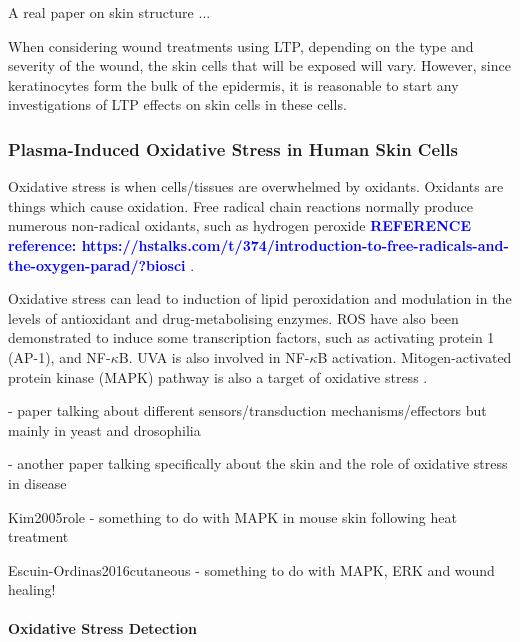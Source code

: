 \documentclass[11pt, oneside]{article}   	%
\newcommand{\toref}[1]{ \textcolor{blue}{\bf{REFERENCE #1}}}
\begin{document}
A real paper on skin structure \cite{Mancini2014microRNAs}...

When considering wound treatments using LTP, depending on the type and severity of the wound, the skin cells that will be exposed will vary.
However, since keratinocytes form the bulk of the epidermis, it is reasonable to start any investigations of LTP effects on skin cells in these cells.



\subsubsection{Plasma-Induced Oxidative Stress in Human Skin Cells}

Oxidative stress is when cells/tissues are overwhelmed by oxidants. 
Oxidants are things which cause oxidation.
Free radical chain reactions normally produce numerous non-radical oxidants, such as hydrogen peroxide \toref{reference: https://hstalks.com/t/374/introduction-to-free-radicals-and-the-oxygen-parad/?biosci} .

Oxidative stress can lead to induction of lipid peroxidation and modulation in the levels of antioxidant and drug-metabolising enzymes.
ROS have also been demonstrated to induce some transcription factors, such as activating protein 1 (AP-1), and NF-$\kappa$B. 
UVA is also involved in NF-$\kappa$B activation.
Mitogen-activated protein kinase (MAPK) pathway is also a target of oxidative stress \cite{Bickers2006oxidative}.

\cite{Nadal2011controlling} - paper talking about different sensors/transduction mechanisms/effectors but mainly in yeast and drosophilia

\cite{Bickers2006oxidative} - another paper talking specifically about the skin and the role of oxidative stress in disease

Kim2005role - something to do with MAPK in mouse skin following heat treatment

Escuin-Ordinas2016cutaneous - something to do with MAPK, ERK and wound healing!

\paragraph{Oxidative Stress Detection}
\end{document}
